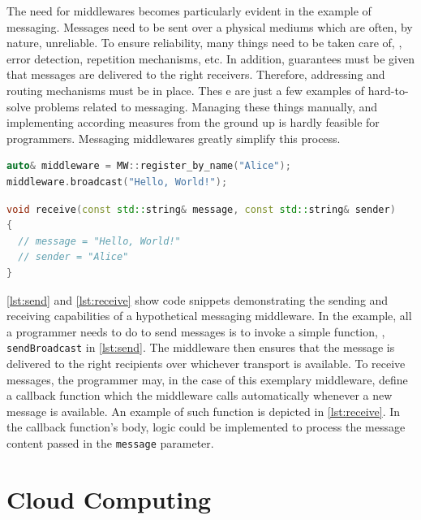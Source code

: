 The need for middlewares becomes particularly evident in the example of messaging. Messages need to be sent over a physical mediums which are often, by nature, unreliable. To ensure reliability, many things need to be taken care of, \eg , error detection, repetition mechanisms, etc. In addition, guarantees must be given that messages are delivered to the right receivers. Therefore, addressing and routing mechanisms must be in place. Thes
e are just a few examples of hard-to-solve problems related to messaging. Managing these things manually, and implementing according measures from the ground up is hardly feasible for programmers. Messaging middlewares greatly simplify this process. 

\begin{lstlisting}[caption={[Middleware send example]A code snippet demonstrating a broadcast dispatch via middleware}, label={lst:send}, language={C++}]
auto& middleware = MW::register_by_name("Alice");
middleware.broadcast("Hello, World!");
\end{lstlisting}

\begin{lstlisting}[caption={[Middleware receive example]An exemplary callback function to receive messages via middleware}, label={lst:receive}, language={C++}]
void receive(const std::string& message, const std::string& sender) 
{ 
  // message = "Hello, World!"
  // sender = "Alice"    
}
\end{lstlisting}

\autoref{lst:send} and \autoref{lst:receive} show code snippets demonstrating the sending and receiving capabilities of a hypothetical messaging middleware. In the example, all a programmer needs to do to send messages is to invoke a simple function, \eg , \texttt{sendBroadcast} in \autoref{lst:send}. The middleware then ensures that the message is delivered to the right recipients over whichever transport is available. To receive messages, the programmer may, in the case of this exemplary middleware, define a callback function which the middleware calls automatically whenever a new message is available. An example of such function is depicted in \autoref{lst:receive}. In the callback function's body, logic could be implemented to process the message content passed in the \texttt{message} parameter.

%
%
%
%
%
%
%
%
%
%

\section{Cloud Computing}

